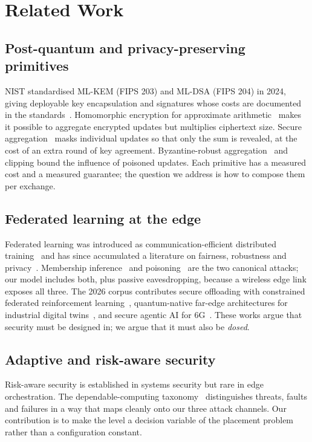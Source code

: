 \documentclass[journal,10pt]{IEEEtran}
\begin{document}
\section{Related Work}
\label{sec:related}

\subsection{Post-quantum and privacy-preserving primitives}
NIST standardised ML-KEM (FIPS 203) and ML-DSA (FIPS 204) in 2024, giving
deployable key encapsulation and signatures whose costs are documented in the
standards~\cite{fips203,fips204}. Homomorphic encryption for approximate
arithmetic~\cite{cheon2017ckks} makes it possible to aggregate encrypted updates
but multiplies ciphertext size. Secure aggregation~\cite{bonawitz2017secagg}
masks individual updates so that only the sum is revealed, at the cost of an
extra round of key agreement. Byzantine-robust aggregation~\cite{blanchard2017byzantine}
and clipping bound the influence of poisoned updates. Each primitive has a
measured cost and a measured guarantee; the question we address is how to
compose them per exchange.

\subsection{Federated learning at the edge}
Federated learning was introduced as communication-efficient distributed
training~\cite{mcmahan2017fl} and has since accumulated a literature on
fairness, robustness and privacy~\cite{kairouz2021fl}. Membership
inference~\cite{shokri2017membership} and poisoning~\cite{biggio2012poisoning}
are the two canonical attacks; our model includes both, plus passive
eavesdropping, because a wireless edge link exposes all three. The 2026 corpus
contributes secure offloading with constrained federated
reinforcement learning~\cite{wang2026craft}, quantum-native far-edge
architectures for industrial digital twins~\cite{sammartino2026qfe}, and
secure agentic AI for 6G~\cite{gaba2026secureagentic}. These works argue that
security must be designed in; we argue that it must also be \emph{dosed}.

\subsection{Adaptive and risk-aware security}
Risk-aware security is established in systems security but rare in edge
orchestration. The dependable-computing taxonomy~\cite{avizienis2004dependable}
distinguishes threats, faults and failures in a way that maps cleanly onto our
three attack channels. Our contribution is to make the level a decision
variable of the placement problem rather than a configuration constant.
\end{document}

